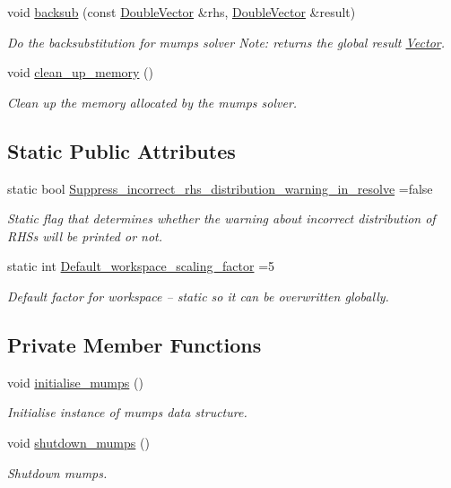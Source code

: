 \begin{DoxyCompactItemize}
void \hyperlink{classoomph_1_1MumpsSolver_a92ab601b671c2b7eea44a470aa5ec4f3}{backsub} (const \hyperlink{classoomph_1_1DoubleVector}{Double\+Vector} \&rhs, \hyperlink{classoomph_1_1DoubleVector}{Double\+Vector} \&result)
\begin{DoxyCompactList}\small\item\em Do the backsubstitution for mumps solver Note\+: returns the global result \hyperlink{classoomph_1_1Vector}{Vector}. \end{DoxyCompactList}\item 
void \hyperlink{classoomph_1_1MumpsSolver_adc1541e4a9cbbe9c641f988380618713}{clean\+\_\+up\+\_\+memory} ()
\begin{DoxyCompactList}\small\item\em Clean up the memory allocated by the mumps solver. \end{DoxyCompactList}\end{DoxyCompactItemize}
\subsection*{Static Public Attributes}
\begin{DoxyCompactItemize}
\item 
static bool \hyperlink{classoomph_1_1MumpsSolver_ab0656b67b21335203eb7fbce8c7c7535}{Suppress\+\_\+incorrect\+\_\+rhs\+\_\+distribution\+\_\+warning\+\_\+in\+\_\+resolve} =false
\begin{DoxyCompactList}\small\item\em Static flag that determines whether the warning about incorrect distribution of R\+H\+Ss will be printed or not. \end{DoxyCompactList}\item 
static int \hyperlink{classoomph_1_1MumpsSolver_ad6bd1660c9c62b039b9cdd8074169a25}{Default\+\_\+workspace\+\_\+scaling\+\_\+factor} =5
\begin{DoxyCompactList}\small\item\em Default factor for workspace -- static so it can be overwritten globally. \end{DoxyCompactList}\end{DoxyCompactItemize}
\subsection*{Private Member Functions}
\begin{DoxyCompactItemize}
\item 
void \hyperlink{classoomph_1_1MumpsSolver_ae5e186152100c7d5f045d3df2a115c72}{initialise\+\_\+mumps} ()
\begin{DoxyCompactList}\small\item\em Initialise instance of mumps data structure. \end{DoxyCompactList}\item 
void \hyperlink{classoomph_1_1MumpsSolver_a5cf1f5e02e905d39e1b324dc921568f6}{shutdown\+\_\+mumps} ()
\begin{DoxyCompactList}\small\item\em Shutdown mumps. \end{DoxyCompactList}\end{DoxyCompactItemize}
